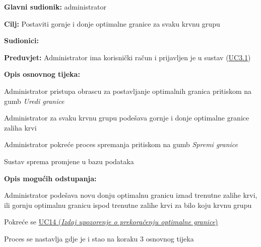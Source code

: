 					
					
					\noindent {}
					\begin{packed_item} \label{UC9}
	
						\item \textbf{Glavni sudionik: }administrator
						\item  \textbf{Cilj:} Postaviti gornje i donje optimalne granice za svaku krvnu grupu
						\item  \textbf{Sudionici:} 
						\item  \textbf{Preduvjet:} Administrator ima korisnički račun i prijavljen je u sustav (\hyperref[UC3.1]{UC3.1})
						\item  \textbf{Opis osnovnog tijeka:}
						
						\item[] \begin{packed_enum}
							\item Administrator pristupa obrascu za postavljanje optimalnih granica pritiskom na gumb \textit{Uredi granice}
	                        \item Administrator za svaku krvnu grupu podešava gornje i donje optimalne granice zaliha krvi
	                        \item Administrator pokreće proces spremanja pritiskom na gumb \textit{Spremi granice}
	                        \item Sustav sprema promjene u bazu podataka
						\end{packed_enum}
						
						\item  \textbf{Opis mogućih odstupanja:}
						
						\item[] \begin{packed_item}
	
							\item[3] Administrator podešava novu donju optimalnu granicu iznad trenutne zalihe krvi, ili gornju optimalnu granicu ispod trenutne zalihe krvi za bilo koju krvnu grupu
							\item[] \begin{packed_enum}
                                \item Pokreće se \hyperref[UC14]{UC14 (\textit{Izdaj upozorenje o prekoračenju optimalne granice})}
                                \item Proces se nastavlja gdje je i stao na koraku 3 osnovnog tijeka
							\end{packed_enum}

						\end{packed_item}
						
					\end{packed_item}
					

